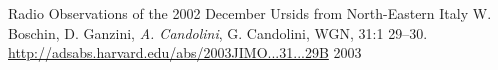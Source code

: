
\begin{cvhonors}

  \cvhonor
{Radio Observations of the 2002 December Ursids from North-Eastern
   Italy}
{ W. Boschin, D. Ganzini, \emph{A. Candolini}, G. Candolini, 
   WGN, 31:1 29--30. \url{http://adsabs.harvard.edu/abs/2003JIMO...31...29B}}
{}
{2003}
\end{cvhonors}











